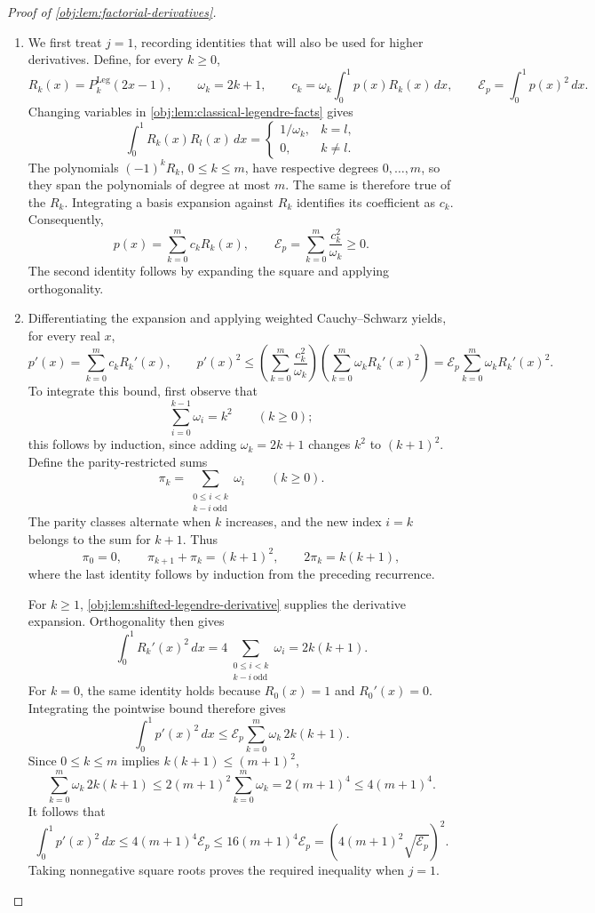 \begin{proof}[Proof of \cref{obj:lem:factorial-derivatives}]
\begin{enumerate}
\item We first treat \(j=1\), recording identities that will also be used for higher derivatives. Define, for every \(k\ge0\),
\[
R_k(x)=P_k^{\mathrm{Leg}}(2x-1),\qquad
\omega_k=2k+1,\qquad
c_k=\omega_k\int_0^1 p(x)R_k(x)\,dx,
\qquad
\mathcal E_p=\int_0^1 p(x)^2\,dx.
\]
Changing variables in \cref{obj:lem:classical-legendre-facts} gives
\[
\int_0^1 R_k(x)R_l(x)\,dx
=
\begin{cases}
1/\omega_k,&k=l,\\
0,&k\ne l.
\end{cases}
\]
The polynomials \((-1)^kR_k\), \(0\le k\le m\), have respective degrees \(0,\ldots,m\), so they span the polynomials of degree at most \(m\). The same is therefore true of the \(R_k\). Integrating a basis expansion against \(R_k\) identifies its coefficient as \(c_k\). Consequently,
\[
p(x)=\sum_{k=0}^m c_kR_k(x),
\qquad
\mathcal E_p=\sum_{k=0}^m\frac{c_k^2}{\omega_k}\ge0.
\]
The second identity follows by expanding the square and applying orthogonality.

\item Differentiating the expansion and applying weighted Cauchy--Schwarz yields, for every real \(x\),
\[
p'(x)=\sum_{k=0}^m c_kR_k'(x),
\qquad
p'(x)^2
\le
\left(\sum_{k=0}^m\frac{c_k^2}{\omega_k}\right)
\left(\sum_{k=0}^m\omega_kR_k'(x)^2\right)
=
\mathcal E_p\sum_{k=0}^m\omega_kR_k'(x)^2.
\]
To integrate this bound, first observe that
\[
\sum_{i=0}^{k-1}\omega_i=k^2\qquad(k\ge0);
\]
this follows by induction, since adding \(\omega_k=2k+1\) changes \(k^2\) to \((k+1)^2\). Define the parity-restricted sums
\[
\pi_k=\sum_{\substack{0\le i<k\\k-i\ \mathrm{odd}}}\omega_i
\qquad(k\ge0).
\]
The parity classes alternate when \(k\) increases, and the new index \(i=k\) belongs to the sum for \(k+1\). Thus
\[
\pi_0=0,\qquad
\pi_{k+1}+\pi_k=(k+1)^2,
\qquad
2\pi_k=k(k+1),
\]
where the last identity follows by induction from the preceding recurrence.

For \(k\ge1\), \cref{obj:lem:shifted-legendre-derivative} supplies the derivative expansion. Orthogonality then gives
\[
\int_0^1 R_k'(x)^2\,dx
=
4\sum_{\substack{0\le i<k\\k-i\ \mathrm{odd}}}\omega_i
=
2k(k+1).
\]
For \(k=0\), the same identity holds because \(R_0(x)=1\) and \(R_0'(x)=0\). Integrating the pointwise bound therefore gives
\[
\int_0^1 p'(x)^2\,dx
\le
\mathcal E_p\sum_{k=0}^m\omega_k\,2k(k+1).
\]
Since \(0\le k\le m\) implies \(k(k+1)\le(m+1)^2\),
\[
\sum_{k=0}^m\omega_k\,2k(k+1)
\le
2(m+1)^2\sum_{k=0}^m\omega_k
=
2(m+1)^4
\le
4(m+1)^4.
\]
It follows that
\[
\int_0^1 p'(x)^2\,dx
\le
4(m+1)^4\mathcal E_p
\le
16(m+1)^4\mathcal E_p
=
\left(4(m+1)^2\sqrt{\mathcal E_p}\right)^2.
\]
Taking nonnegative square roots proves the required inequality when \(j=1\).


\end{enumerate}
\end{proof}

